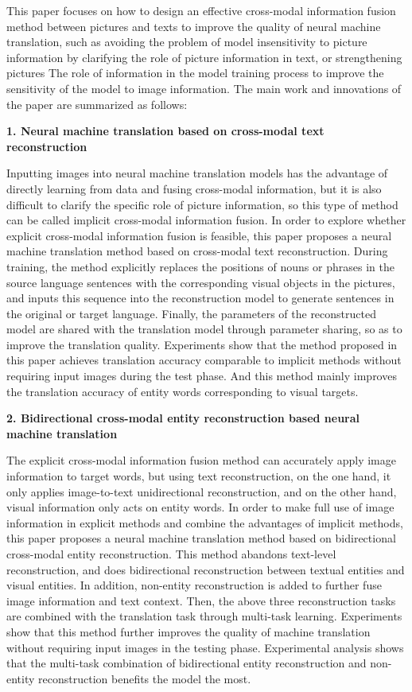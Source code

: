 This paper focuses on how to design an effective cross-modal information fusion method between pictures and texts to improve the quality of neural machine translation, such as avoiding the problem of model insensitivity to picture information by clarifying the role of picture information in text, or strengthening pictures The role of information in the model training process to improve the sensitivity of the model to image information. The main work and innovations of the paper are summarized as follows:

\textbf{1. Neural machine translation based on cross-modal text reconstruction}

Inputting images into neural machine translation models has the advantage of directly learning from data and fusing cross-modal information, but it is also difficult to clarify the specific role of picture information, so this type of method can be called implicit cross-modal information fusion. In order to explore whether explicit cross-modal information fusion is feasible, this paper proposes a neural machine translation method based on cross-modal text reconstruction. During training, the method explicitly replaces the positions of nouns or phrases in the source language sentences with the corresponding visual objects in the pictures, and inputs this sequence into the reconstruction model to generate sentences in the original or target language. Finally, the parameters of the reconstructed model are shared with the translation model through parameter sharing, so as to improve the translation quality. Experiments show that the method proposed in this paper achieves translation accuracy comparable to implicit methods without requiring input images during the test phase. And this method mainly improves the translation accuracy of entity words corresponding to visual targets.

\textbf{2. Bidirectional cross-modal entity reconstruction based neural machine translation}

The explicit cross-modal information fusion method can accurately apply image information to target words, but using text reconstruction, on the one hand, it only applies image-to-text unidirectional reconstruction, and on the other hand, visual information only acts on entity words. In order to make full use of image information in explicit methods and combine the advantages of implicit methods, this paper proposes a neural machine translation method based on bidirectional cross-modal entity reconstruction. This method abandons text-level reconstruction, and does bidirectional reconstruction between textual entities and visual entities. In addition, non-entity reconstruction is added to further fuse image information and text context. Then, the above three reconstruction tasks are combined with the translation task through multi-task learning. Experiments show that this method further improves the quality of machine translation without requiring input images in the testing phase. Experimental analysis shows that the multi-task combination of bidirectional entity reconstruction and non-entity reconstruction benefits the model the most.

